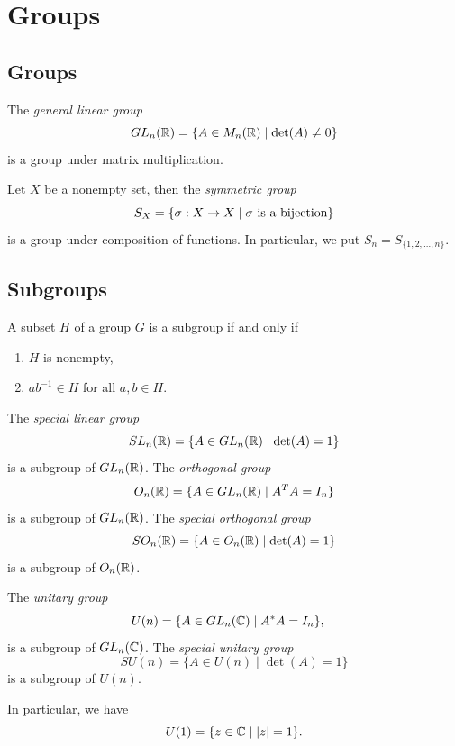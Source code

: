 \chapter{Groups}
\section{Groups}

\begin{example}
  The \emph{general linear group} \[
    GL_n(\mathbb{R}) = \{A\in M_n(\mathbb{R}) \mid \det(A)\neq 0\}
  \] is a group under matrix multiplication.
\end{example}

\begin{example}
  Let \(X\) be a nonempty set, then the \emph{symmetric group} \[
    S_X = \{\sigma:X\to X \mid \sigma\text{ is a bijection}\}
  \] is a group under composition of functions. In particular, we put \(S_n = S_{\{1,2,\ldots,n\}}\).
\end{example}
\section{Subgroups}

\begin{lemma}
  A subset \(H\) of a group \(G\) is a subgroup if and only if \begin{enumerate}
    \item \(H\) is nonempty,
    \item \(ab^{-1}\in H\) for all \(a,b\in H\).
  \end{enumerate}
\end{lemma}

\begin{example}
  The \emph{special linear group} \[
    SL_n(\mathbb{R}) = \{A\in GL_n(\mathbb{R}) \mid \det(A) = 1\}
  \] is a subgroup of \(GL_n(\mathbb{R})\). The \emph{orthogonal group} \[
    O_n(\mathbb{R}) = \{A\in GL_n(\mathbb{R}) \mid A^TA = I_n\}
  \] is a subgroup of \(GL_n(\mathbb{R})\). The \emph{special orthogonal group} \[
    SO_n(\mathbb{R}) = \{A\in O_n(\mathbb{R}) \mid \det(A) = 1\}
  \] is a subgroup of \(O_n(\mathbb{R})\).
\end{example}

\begin{example}
  The \emph{unitary group} \[
    U(n) = \{A\in GL_n(\mathbb{C}) \mid A^*A = I_n\}, \quad
  \] is a subgroup of \(GL_n(\mathbb{C})\). The \emph{special unitary group} \[
    SU(n) = \{A\in U(n) \mid \det(A) = 1\}
  \] is a subgroup of \(U(n)\).

  In particular, we have \[
    U(1) = \{z\in\mathbb{C} \mid |z| = 1\}.
  \]
\end{example}

